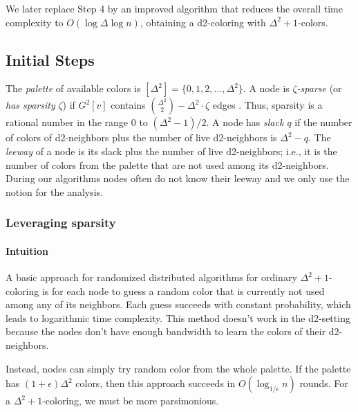 We later replace Step 4 by an improved algorithm that reduces the overall time complexity to $O(\log \Delta \log n)$, obtaining a d2-coloring with $\Delta^2+1$-colors.

\subsection{Initial Steps}


The \emph{palette} of available colors is $[\Delta^2] = \{0,1,2,\ldots, \Delta^2\}$. 
%
A node is \emph{$\zeta$-sparse} (or \emph{has sparsity} $\zeta$) if $G^2[v]$ contains $\binom{\Delta^2}{2} - \Delta^2\cdot \zeta$ edges . Thus, sparsity is a rational number in the range $0$ to $(\Delta^2-1)/2$.
A node has \emph{slack $q$} if the number of colors of d2-neighbors plus the number of live d2-neighbors is $\Delta^2-q$.
The \emph{leeway} of a node is its slack plus the number of live d2-neighbors; i.e., it is the number of colors from the palette that are not used among its d2-neighbors.
During our algorithms nodes often do not know their leeway and we only use the notion for the analysis.

\subsubsection{Leveraging sparsity} 

\paragraph*{Intuition}
A basic approach for randomized distributed algorithms for ordinary $\Delta^2+1$-coloring is for each node to guess a random color that is currently not used among any of its neighbors. Each guess succeeds with constant probability, which leads to logarithmic time complexity. This method doesn't work in the d2-setting because the nodes don't have enough bandwidth to learn the colors of their d2-neighbors.

Instead, nodes can simply try random color from the whole palette. If the palette has $(1+\epsilon)\Delta^2$ colors, then this approach succeeds in $O(\log_{1/\epsilon} n)$ rounds. For a $\Delta^2+1$-coloring, we must be more parsimonious. 

